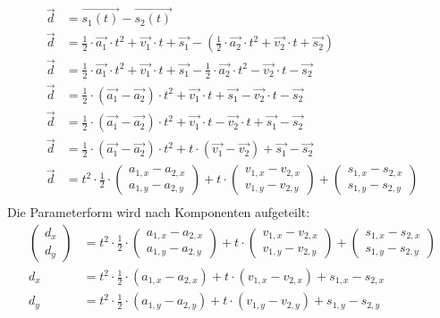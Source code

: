 \begin{align}
    \vec{d} &= \vec{s_1(t)} - \vec{s_2(t)}\\
    \vec{d} &= \frac{1}{2} \cdot \vec{a_1} \cdot t^2 + \vec{v_{1}} \cdot t + \vec{s_{1}} - (\frac{1}{2} \cdot \vec{a_2} \cdot t^2 + \vec{v_{2}} \cdot t + \vec{s_{2}})\\
    \vec{d} &= \frac{1}{2} \cdot \vec{a_1} \cdot t^2 + \vec{v_{1}} \cdot t + \vec{s_{1}} - \frac{1}{2} \cdot \vec{a_2} \cdot t^2 - \vec{v_{2}} \cdot t - \vec{s_{2}}\\
    \vec{d} &= \frac{1}{2} \cdot (\vec{a_1} - \vec{a_2}) \cdot t^2 + \vec{v_{1}} \cdot t + \vec{s_{1}} - \vec{v_{2}} \cdot t - \vec{s_{2}}\\
    \vec{d} &= \frac{1}{2} \cdot (\vec{a_1} - \vec{a_2}) \cdot t^2 + \vec{v_{1}} \cdot t - \vec{v_{2}} \cdot t + \vec{s_{1}} - \vec{s_{2}}\\
    \vec{d} &= \frac{1}{2} \cdot (\vec{a_1} - \vec{a_2}) \cdot t^2 + t \cdot (\vec{v_{1}} - \vec{v_{2}}) + \vec{s_{1}} - \vec{s_{2}}\\
    \vec{d} &= t^2 \cdot \frac{1}{2} \cdot \begin{pmatrix}a_{1,x} - a_{2,x}\\a_{1,y} - a_{2,y}\end{pmatrix} + t \cdot \begin{pmatrix}v_{1,x} - v_{2,x}\\v_{1,y} - v_{2,y}\end{pmatrix} + \begin{pmatrix}s_{1,x} - s_{2,x}\\s_{1,y} - s_{2,y}\end{pmatrix}\\
\end{align}
Die Parameterform wird nach Komponenten aufgeteilt:
\begin{align}
    \begin{pmatrix}d_{x}\\d_{y}\end{pmatrix} &= t^2 \cdot \frac{1}{2} \cdot \begin{pmatrix}a_{1,x} - a_{2,x}\\a_{1,y} - a_{2,y}\end{pmatrix} + t \cdot \begin{pmatrix}v_{1,x} - v_{2,x}\\v_{1,y} - v_{2,y}\end{pmatrix} + \begin{pmatrix}s_{1,x} - s_{2,x}\\s_{1,y} - s_{2,y}\end{pmatrix}\\
    d_x &= t^2 \cdot \frac{1}{2} \cdot (a_{1,x} - a_{2,x}) + t \cdot (v_{1,x} - v_{2,x}) + s_{1,x} - s_{2,x}\\
    d_y &= t^2 \cdot \frac{1}{2} \cdot (a_{1,y} - a_{2,y}) + t \cdot (v_{1,y} - v_{2,y}) + s_{1,y} - s_{2,y}
\end{align}
